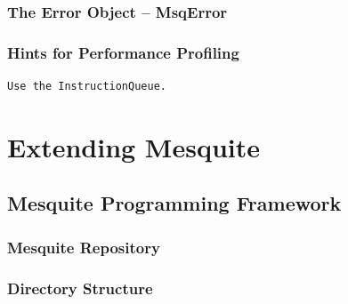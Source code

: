 \documentclass[letter]{report}
\begin{document}
\subsection{The Error Object -- MsqError}
\label{sec:MsqError}

\subsection{Hints for Performance Profiling}

\begin{verbatim}
Use the InstructionQueue. 
\end{verbatim}


\chapter{Extending Mesquite}

\section{Mesquite Programming Framework}

\subsection{Mesquite Repository} 

\subsection{Directory Structure}
\end{document}

